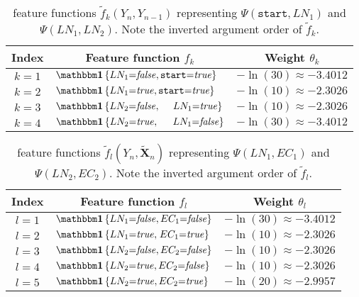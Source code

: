 \begin{table}[H]
\centering
\begin{tabular}{c l c}
 \toprule
 Index & \multicolumn{1}{c}{Feature function $f_k$} & Weight $\theta_k$ \\
 \midrule
 $k=1$ & $\identityfun\left\{LN_1{=}\mathit{false},\texttt{start}{=}\mathit{true}\right\}$ & $-\ln(30)\approx-3.4012$ \\
 $k=2$ & $\identityfun\left\{LN_1{=}\mathit{true},\texttt{start}{=}\mathit{true}\right\}$ & $-\ln(10)\approx-2.3026$ \\
 $k=3$ & $\identityfun\left\{LN_2{=}\mathit{false},\ \ \ \ \hspace{-0.1mm}LN_1{=}\mathit{true}\right\}$ & $-\ln(10)\approx-2.3026$\\
 $k=4$ & $\identityfun\left\{LN_2{=}\mathit{true},\ \ \ \ \hspace{0.4mm}LN_1{=}\mathit{false}\right\}$ & $-\ln(30)\approx-3.4012$ \\
 \bottomrule
\end{tabular}
\caption{\Glspl{feature function} $\tilde{f}_k(Y_n,Y_{n-1})$ representing $\Psi(\texttt{start},LN_1)$ and $\Psi(LN_1,LN_2)$. Note the inverted argument order of $\tilde{f}_k$.}
\label{tab:example-linear-chain-crf-feature-functions-f-k}
\end{table}

\begin{table}[H]
\centering
\begin{tabular}{c l c}
 \toprule
 Index & \multicolumn{1}{c}{Feature function $f_l$ } & Weight $\theta_l$ \\
 \midrule
 $l=1$ & $\identityfun\left\{LN_1{=}\mathit{false},EC_1{=}\mathit{false}\right\}$ & $-\ln(30)\approx-3.4012$ \\
 $l=2$ & $\identityfun\left\{LN_1{=}\mathit{true},\hspace{0.4mm}EC_1{=}\mathit{true}\right\}$ & $-\ln(10)\approx-2.3026$ \\
 $l=3$ & $\identityfun\left\{LN_2{=}\mathit{false},EC_2{=}\mathit{false}\right\}$ & $-\ln(10)\approx-2.3026$ \\
 $l=4$ & $\identityfun\left\{LN_2{=}\mathit{true},EC_2{=}\mathit{false}\right\}$ & $-\ln(10)\approx-2.3026$ \\
 $l=5$ & $\identityfun\left\{LN_2{=}\mathit{true},EC_2{=}\mathit{true}\right\}$ & $-\ln(20)\approx-2.9957$ \\
 \bottomrule
\end{tabular}
\caption{\Glspl{feature function} $\tilde{f}_l(Y_n,\tilde{\mathbf{X}}_n)$ representing $\Psi(LN_1,EC_1)$ and $\Psi(LN_2,EC_2)$. Note the inverted argument order of $\tilde{f}_l$.}
\label{tab:example-linear-chain-crf-feature-functions-f-l}
\end{table}

